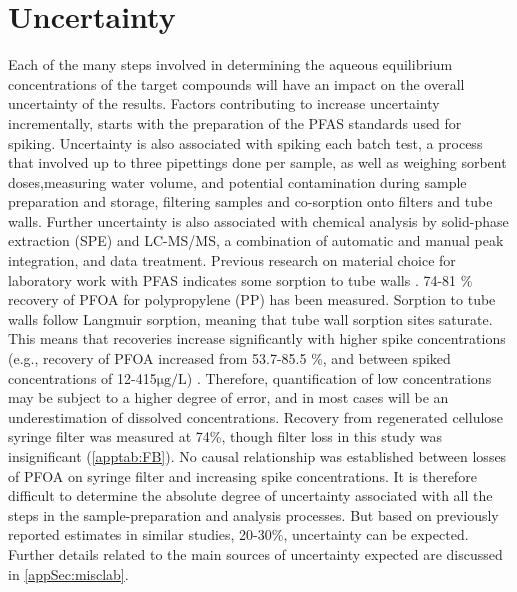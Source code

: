 \section{Uncertainty\label{sec:losses}}
Each of the many steps involved in determining the aqueous equilibrium concentrations of the target compounds will have an impact on the overall uncertainty of the results. Factors contributing to increase uncertainty incrementally, starts with the preparation of the PFAS standards used for spiking. Uncertainty is also associated with spiking each batch test, a process that involved up to three pipettings done per sample, as well as weighing sorbent doses,measuring water volume, and potential contamination during sample preparation and storage, filtering samples and co-sorption onto filters and tube walls. Further uncertainty is also associated with chemical analysis by solid-phase extraction (SPE) and LC-MS/MS, a combination of automatic and manual peak integration, and data treatment. Previous research on material choice for laboratory work with PFAS indicates some sorption to tube walls \citep{Lath2019labsorb}. 74-81 \% recovery of PFOA for polypropylene (PP) has been measured. Sorption to tube walls follow Langmuir sorption, meaning that tube wall sorption sites saturate. This means that recoveries increase significantly with higher spike concentrations (e.g., recovery of PFOA increased from 53.7-85.5 \%, and between spiked concentrations of 12-415$\mathrm{\mu g/L}$) \citep{Lath2019labsorb}. Therefore, quantification of low concentrations may be subject to a higher degree of error, and in most cases will be an underestimation of dissolved concentrations. Recovery from regenerated cellulose syringe filter was measured at 74\%, though filter loss in this study was insignificant (\cref{apptab:FB}). No causal relationship was established between losses of PFOA on syringe filter and increasing spike concentrations. It is therefore difficult to determine the absolute degree of uncertainty associated with all the steps in the sample-preparation and analysis processes. But based on previously reported estimates in similar studies, 20-30\%, uncertainty can be expected. Further details related to the main sources of uncertainty expected are discussed in \cref{appSec:misclab}. 



